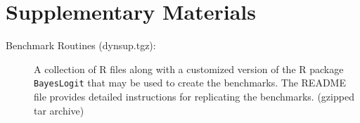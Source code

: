 \documentclass[12pt]{article}
\begin{document}
\newpage

\section*{Supplementary Materials}

\begin{description}

\item[Benchmark Routines (dynsup.tgz):] A collection of R files along with a customized
  version of the R package \texttt{BayesLogit} that may be used to create the
  benchmarks.  The README file provides detailed instructions for replicating
  the benchmarks.  (gzipped tar archive)

\end{description}


{}

\end{document}
